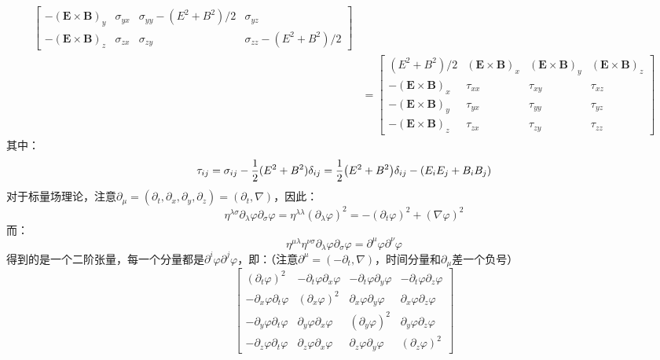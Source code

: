 \documentclass[a4paper]{article}
\begin{document}
\begin{enumerate}
\begin{align*}
\begin{bmatrix}
        -(\mathbf{E} \times \mathbf{B})_y & \sigma_{yx} & \sigma_{yy} - (E^2 + B^2)/2 & \sigma_{yz} \\
        -(\mathbf{E} \times \mathbf{B})_z & \sigma_{zx} & \sigma_{zy} & \sigma_{zz} - (E^2 + B^2)/2
        \end{bmatrix} \\
        &= \begin{bmatrix}
        (E^2 + B^2)/2 & (\mathbf{E} \times \mathbf{B})_x & (\mathbf{E} \times \mathbf{B})_y & (\mathbf{E} \times \mathbf{B})_z \\
        -(\mathbf{E} \times \mathbf{B})_x & \tau_{xx} & \tau_{xy} & \tau_{xz} \\
        -(\mathbf{E} \times \mathbf{B})_y & \tau_{yx} & \tau_{yy} & \tau_{yz} \\
        -(\mathbf{E} \times \mathbf{B})_z & \tau_{zx} & \tau_{zy} & \tau_{zz}
        \end{bmatrix}
    \end{align*}
    其中：
    \[
        \tau_{ij} = \sigma_{ij} - \frac{1}{2} (E^2 + B^2) \delta_{ij} = \frac{1}{2} \qty(E^2 + B^2) \delta_{ij} - (E_i E_j + B_i B_j)
    \]
    对于标量场理论，注意$\partial_\mu = (\partial_t, \partial_x, \partial_y, \partial_z) = (\partial_t, \nabla)$，因此：
    \[
        \eta^{\lambda\sigma} \partial_\lambda \varphi \partial_\sigma \varphi = \eta^{\lambda\lambda} (\partial_\lambda \varphi)^2 = -(\partial_t \varphi)^2 + (\nabla \varphi)^2
    \]
    而：
    \[
        \eta^{\mu\lambda} \eta^{\nu\sigma} \partial_\lambda \varphi \partial_\sigma \varphi = \partial^\mu \varphi \partial^\nu \varphi
    \]
    得到的是一个二阶张量，每一个分量都是$\partial^i \varphi \partial^j \varphi$，即：（注意$\partial^\mu = (-\partial_t, \nabla)$，时间分量和$\partial_\mu$差一个负号）
    \[
        \begin{bmatrix}
        (\partial_t \varphi)^2 & -\partial_t \varphi \partial_x \varphi & -\partial_t \varphi \partial_y \varphi & -\partial_t \varphi \partial_z \varphi \\
        -\partial_x \varphi \partial_t \varphi & (\partial_x \varphi)^2 & \partial_x \varphi \partial_y \varphi & \partial_x \varphi \partial_z \varphi \\
        -\partial_y \varphi \partial_t \varphi & \partial_y \varphi \partial_x \varphi & (\partial_y \varphi)^2 & \partial_y \varphi \partial_z \varphi \\
        -\partial_z \varphi \partial_t \varphi & \partial_z \varphi \partial_x \varphi & \partial_z \varphi \partial_y \varphi & (\partial_z \varphi)^2

\end{bmatrix}\]
\end{enumerate}
\end{document}
